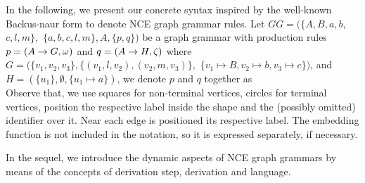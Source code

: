 \documentclass[]{report}
\begin{document}
In the following, we present our concrete syntax inspired by the well-known Backus-naur form to denote NCE graph grammar rules. Let $GG = (\{A, B, a, b,$ $ c, l, m\},$ $\{a, b, c, l, m\}, A, \{p,q\})$ be a graph grammar with production rules $p = (A \to G,\omega)$ and $q = (A \to H,\zeta)$ where $G = (\{v_1, v_2, v_3\}, \{(v_1,l,v_2), (v_2,m,v_3)\},$ $\{v_1 \mapsto B, v_2 \mapsto b, v_3 \mapsto c \})$, and $H = (\{u_1\}, \emptyset, \{u_1 \mapsto a\})$, we denote $p$ and $q$ together as\\


Observe that, we use squares for non-terminal vertices, circles for terminal vertices, position the respective label inside the shape and the (possibly omitted) identifier over it. Near each edge is positioned its respective label. The embedding function is not included in the notation, so it is expressed separately, if necessary.


In the sequel, we introduce the dynamic aspects of NCE graph grammars by means of the concepts of derivation step, derivation and language.
\end{document}
